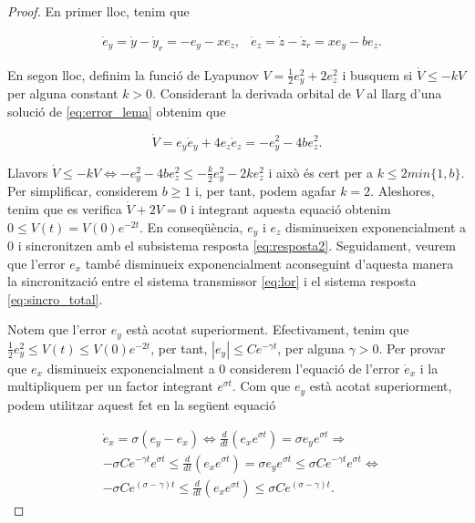 \documentclass[11pt,a4paper,openright,oneside]{article}
\numberwithin{equation}{section}
\theoremstyle{definition}
\begin{document}
\begin{proof}
    En primer lloc, tenim que 

    \begin{equation}\begin{aligned}\label{eq:error_lema}
        &\dot{e}_y = \dot{y} - \dot{y}_r = -e_y - xe_z,
        &\dot{e}_z = \dot{z} - \dot{z}_r = xe_y-be_z.
    \end{aligned}\end{equation}

    En segon lloc, definim la funció de Lyapunov $V = \frac{1}{2}e_y^2 + 2e_z^2$ i busquem si $\dot{V}\le-kV$ per alguna constant $k>0$. Considerant la derivada orbital de $V$ al llarg d'una solució de  \eqref{eq:error_lema} obtenim que 
    
    \begin{equation}
            \dot{V}=e_y\dot{e}_y+4e_z\dot{e}_z=-e_y^2-4be_z^2.
    \end{equation}
    
    Llavors $\dot{V}\le-kV\iff-e_y^2-4be_z^2\le-\frac{k}{2}e_y^2-2ke_z^2$ i això és cert per a $k\le2min\{1,b\}$. Per simplificar, considerem $b\geq1$ i, per tant, podem agafar $k=2$. Aleshores, tenim que es verifica $\dot{V}+2V=0$ i integrant aquesta equació obtenim $0\le V(t)=V(0)e^{-2t}$. En conseqüència, $e_y$ i $e_z$ disminueixen exponencialment a $0$ i sincronitzen amb el subsistema resposta \eqref{eq:resposta2}. Seguidament, veurem que l'error $e_x$ també disminueix exponencialment aconseguint d'aquesta manera la sincronització entre el sistema transmissor \eqref{eq:lor} i el sistema resposta \eqref{eq:sincro_total}.

    Notem que l'error $e_y$ està acotat superiorment. Efectivament, tenim que $\frac{1}{2}e_y^2\le V\left(t\right)\le V(0)e^{-2t}$, per tant, $|e_y|\le Ce^{-\gamma t}$, per alguna $\gamma>0$. Per provar que $e_x$ disminueix exponencialment a $0$ considerem l'equació de l'error $\dot{e}_x$ i la multipliquem per un factor integrant $e^{\sigma t}$. Com que $e_y$ està acotat superiorment, podem utilitzar aquest fet en la següent equació      

    \begin{equation}\begin{aligned} \label{eq:error_acotat}
        &\dot{e}_x=\sigma\left(e_y-e_x\right)\iff \frac{d}{dt}\left(e_xe^{\sigma t}\right)=\sigma e_ye^{\sigma t}\Rightarrow \\
        &-\sigma Ce^{-\gamma t}e^{\sigma t}\le \frac{d}{dt}\left(e_xe^{\sigma t}\right)=\sigma e_ye^{\sigma t} \le \sigma Ce^{-\gamma t}e^{\sigma t} \iff \\ 
        &-\sigma Ce^{\left(\sigma-\gamma\right) t} \le \frac{d}{dt}\left(e_xe^{\sigma t}\right) \le \sigma Ce^{(\sigma-\gamma) t}.
    \end{aligned}\end{equation}


\end{proof}
\end{document}
